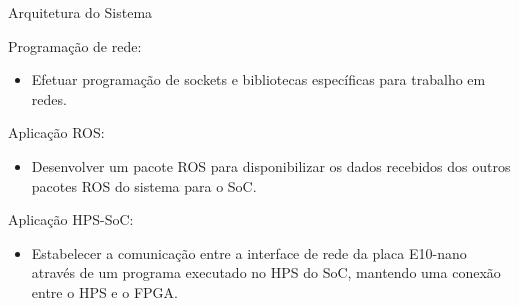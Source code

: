 \documentclass[10pt]{beamer}
\begin{document}
\begin{frame}{Arquitetura do Sistema}
    \begin{alertblock}{}
        \begin{block}{Programação de rede:}
            \begin{itemize}
                \item Efetuar programação de sockets e bibliotecas específicas para trabalho em redes.
            \end{itemize}
        \end{block}
		\vspace{0.25cm}
        \begin{block}{Aplicação ROS:}
            \begin{itemize}
                \item Desenvolver um pacote ROS para disponibilizar os dados recebidos dos outros pacotes ROS do sistema para o SoC.
            \end{itemize}
        \end{block}
		\vspace{0.25cm}
		\begin{block}{Aplicação HPS-SoC:}
            \begin{itemize}
                \item Estabelecer a comunicação entre a interface de rede da placa E10-nano através de	um programa executado no HPS do SoC, mantendo uma conexão entre o HPS e o FPGA.
            \end{itemize}
        \end{block}
    \end{alertblock}
\end{frame}
\end{document}

